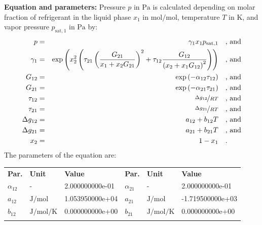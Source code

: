 \textbf{Equation and parameters:}
\newline
%
Pressure $p$ in $\si{\pascal}$ is calculated depending on molar fraction of refrigerant in the liquid phase $x_1$ in $\si{\mole\per\mole}$, temperature $T$ in $\si{\kelvin}$, and vapor pressure $p_\mathrm{sat,1}$ in $\si{\pascal}$ by:
%
\begin{equation*}
\begin{split}
p &=& \gamma_1 x_1 p_\mathrm{sat,1} & \quad\text{, and} \\
\gamma_1 &=& \exp \left( x_2^2 \left( \tau_{21} \left( \frac{G_{21}}{x_1 + x_2 G_{21}} \right) ^2 + \tau_{12} \frac{G_{12}}{\left( x_2 + x_1 G_{12} \right) ^2}\right) \right) & \quad\text{, and} \\
G_{12} &=& \exp \left( -\alpha_{12} \tau_{12} \right) & \quad\text{, and} \\
G_{21} &=& \exp \left( -\alpha_{21} \tau_{21} \right) & \quad\text{, and} \\
\tau_{12} &=& \nicefrac{\Delta g_{12}}{R T} & \quad\text{, and} \\
\tau_{21} &=& \nicefrac{\Delta g_{21}}{R T} & \quad\text{, and} \\
\Delta g_{12} &=& a_{12} + b_{12} T & \quad\text{, and} \\
\Delta g_{21} &=& a_{21} + b_{21} T & \quad\text{, and} \\
x_2 &=& 1 - x_1  & \quad\text{.} \\
\end{split}
\end{equation*}
%
The parameters of the equation are:
%
\begin{longtable}[l]{lll|lll}
\toprule
\addlinespace
\textbf{Par.} & \textbf{Unit} & \textbf{Value} &	\textbf{Par.} & \textbf{Unit} & \textbf{Value} \\
\addlinespace
\midrule
\endhead

\bottomrule
\endfoot
\bottomrule
\endlastfoot
\addlinespace

$\alpha_{12}$ & - & 2.000000000e-01 & $\alpha_{21}$ & - & 2.000000000e-01 \\
$a_{12}$ & $\si{\joule\per\mole}$ & 1.053950000e+04 & $a_{21}$ & $\si{\joule\per\mole}$ & -1.719500000e+03 \\
$b_{12}$ & $\si{\joule\per\mole\per\kelvin}$ & 0.000000000e+00 & $b_{21}$ & $\si{\joule\per\mole\per\kelvin}$ & 0.000000000e+00 \\

\addlinespace\end{longtable}

